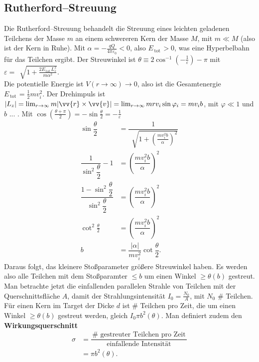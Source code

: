 \documentclass[a4paper,12pt]{article}
\numberwithin{equation}{section}
\begin{document}
\subsection{Rutherford--Streuung}
Die Rutherford--Streuung behandelt die Streuung eines leichten geladenen Teilchens der Masse $m$ an einem schwereren Kern der Masse $M$, mit $m\ll M$ (also ist der Kern in Ruhe). Mit $\alpha =-\tfrac{qQ}{4\pi \varepsilon _0}<0$, also $E_{\,\text{tot}\,}>0$, was eine Hyperbelbahn für das Teilchen ergibt. Der Streuwinkel ist $\theta \equiv 2\cos ^{-1}\left(-\tfrac{1}{\varepsilon }\right)-\pi $ mit $\varepsilon =\,\sqrt[]{1+\tfrac{2E_{\,\text{tot}\,}L_z^2}{m\alpha ^2}}$.\\\indent
Die potentielle Energie ist $V\left(r\rightarrow \infty\right)\rightarrow 0$, also ist die Gesamtenergie $E_{\,\text{tot}\,}=\tfrac{1}{2}mv_i^2$. Der Drehimpuls ist $|L_z|=\lim_{r\rightarrow \infty}m|\vv{r}\times \vv{v}|=\lim_{r\rightarrow \infty}mrv_i\sin \varphi _i=mv_ib$, mit $\varphi \ll 1$ und $b$ ... . Mit $\cos \left(\tfrac{\theta +\pi }{2}\right)=-\sin \tfrac{\theta }{2}=-\tfrac{1}{\varepsilon }$ 
\begin{align*}
        \sin \dfrac{\theta }{2}&=\dfrac{1}{\,\sqrt[]{1+\left(\tfrac{mv_i^2b}{\alpha }\right)^2}}\\
        \dfrac{1}{\sin ^2 \dfrac{\theta }{2}}-1&=\left(\dfrac{mv_i^2b}{\alpha }\right)^2\\
        \dfrac{1-\sin ^2 \dfrac{\theta }{2}}{\sin ^2 \dfrac{\theta }{2}}&=\left(\dfrac{mv_i^2b}{\alpha }\right)^2\\
        \cot ^2 \tfrac{\theta }{2}&=\left(\dfrac{mv_i^2b}{\alpha }\right)^2\\
        b&=\dfrac{|\alpha |}{mv_i^2}\cot \dfrac{\theta }{2}
.\end{align*}
Daraus folgt, das kleinere Stoßparameter größere Streuwinkel haben. Es werden also alle Teilchen mit dem Stoßparamter $\leq b$ um einen Winkel $\geq \theta \left(b\right)$ gestreut.\\\indent
Man betrachte jetzt die einfallenden parallelen Strahle von Teilchen mit der Querschnittsfläche $A$, damit der Strahlungsintensität $I_0=\tfrac{N_0}{A}$, mit $N_0$ $\#$ Teilchen. Für einen Kern im Target der Dicke $d$ ist $\#$ Teilchen pro Zeit, die um einen Winkel $\geq \theta \left(b\right)$ gestreut werden, gleich $I_0\pi b^2\left(\theta \right)$. Man definiert zudem den \textbf{Wirkungsquerschnitt} 
\begin{align*}
        \sigma &=\dfrac{\,\text{$\#$ gestreuter Teilchen pro Zeit}\,}{\,\text{einfallende Intensität}\,}\\
               &=\pi b^2\left(\theta \right)
.\end{align*}
\end{document}
